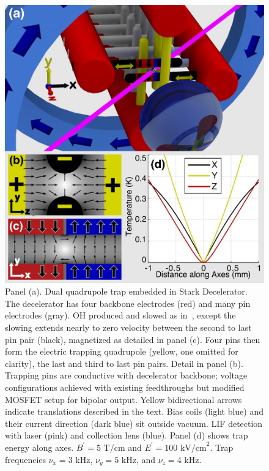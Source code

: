 \documentclass[%
 reprint,
groupedaddress,
 amsmath,amssymb,
 aps,
prl,
]{revtex4-1}
\begin{document}
\begin{figure}[tb]
\includegraphics[width=\linewidth]{Geometry/CAD_recolor_laser_panels.PNG}%
\caption{
Panel (a). Dual quadrupole trap embedded in Stark Decelerator. The decelerator has four backbone electrodes (red) and many pin electrodes (gray). OH produced and slowed as in~\cite{Sawyer2008}, except the slowing extends nearly to zero velocity between the second to last pin pair (black), magnetized as detailed in panel (c). Four pins then form the electric trapping quadrupole (yellow, one omitted for clarity), the last and third to last pin pairs. Detail in panel (b). Trapping pins are conductive with decelerator backbone; voltage configurations achieved with existing feedthroughs but modified MOSFET setup for bipolar output. Yellow bidirectional arrows indicate translations described in the text. Bias coils (light blue) and their current direction (dark blue) sit outside vacuum. LIF detection with laser (pink) and collection lens (blue). Panel (d) shows trap energy along axes. $B^\prime=5\text{ T/cm}$ and $E^\prime=100 \text{ kV/cm}^2$. Trap frequencies $\nu_x=3\text{ kHz}$, $\nu_y=5\text{ kHz}$, and $\nu_z=4\text{ kHz}$.\label{fig:CAD}}
\end{figure}
\end{document}
